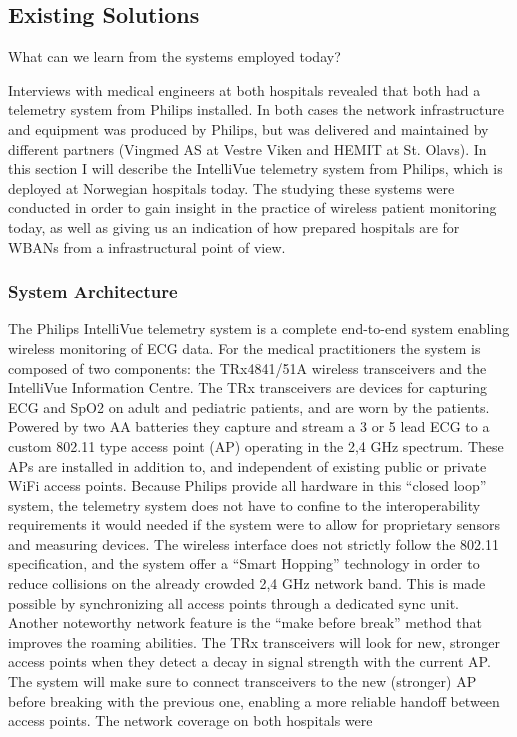 \subsection{Existing Solutions} %
\label{sub:existing_solutions}

What can we learn from the systems employed today?

Interviews with medical engineers at both hospitals revealed that both had a telemetry system from Philips installed. In both cases the network infrastructure and equipment was produced by Philips, but was delivered and maintained by different partners (Vingmed AS at Vestre Viken and HEMIT at St. Olavs). In this section I will describe the IntelliVue telemetry system from Philips, which is deployed at Norwegian hospitals today. The studying these systems were conducted in order to gain insight in the practice of wireless patient monitoring today, as well as giving us an indication of how prepared hospitals are for WBANs from a infrastructural point of view.

\subsubsection{System Architecture} %
\label{ssub:system_architecture}

The Philips IntelliVue telemetry system is a complete end-to-end system enabling wireless monitoring of ECG data. For the medical practitioners the system is composed of two components: the TRx4841/51A wireless transceivers and the IntelliVue Information Centre. The TRx transceivers are devices for capturing ECG and SpO2 on adult and pediatric patients, and are worn by the patients. Powered by two AA batteries they  capture and stream a 3 or 5 lead ECG to a custom 802.11 type access point (AP) operating in the 2,4 GHz spectrum. These APs are installed in addition to, and independent of existing public or private WiFi access points. Because Philips provide all hardware in this ``closed loop'' system, the telemetry system does not have to confine to the interoperability requirements it would needed if the system were to allow for proprietary sensors and measuring devices. The wireless interface does not strictly follow the 802.11 specification, and the system offer a ``Smart Hopping'' technology in order to reduce collisions on the already crowded 2,4 GHz network band. This is made possible by synchronizing all access points through a dedicated sync unit. Another noteworthy network feature is the ``make before break'' method that improves the roaming abilities. The TRx transceivers will look for new, stronger access points when they detect a decay in signal strength with the current AP. The system will make sure to connect transceivers to the new (stronger) AP before breaking with the previous one, enabling a more reliable handoff between access points. The network coverage on both hospitals were 

